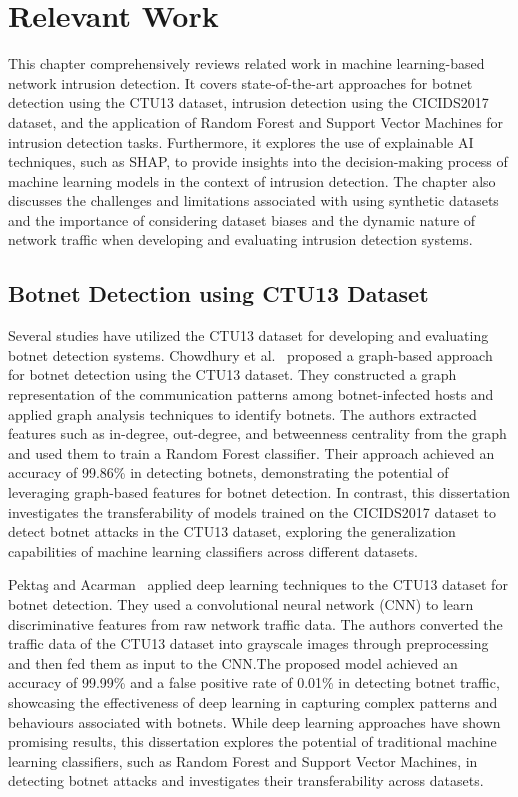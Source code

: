 \chapter{Relevant Work}

This chapter comprehensively reviews related work in machine learning-based network intrusion detection. It covers state-of-the-art approaches for botnet detection using the CTU13 dataset, intrusion detection using the CICIDS2017 dataset, and the application of Random Forest and Support Vector Machines for intrusion detection tasks. Furthermore, it explores the use of explainable AI techniques, such as SHAP, to provide insights into the decision-making process of machine learning models in the context of intrusion detection. The chapter also discusses the challenges and limitations associated with using synthetic datasets and the importance of considering dataset biases and the dynamic nature of network traffic when developing and evaluating intrusion detection systems.

\section{Botnet Detection using CTU13 Dataset}

Several studies have utilized the CTU13 dataset for developing and evaluating botnet detection systems. Chowdhury et al.~\cite{chowdhury2017botnet} proposed a graph-based approach for botnet detection using the CTU13 dataset. They constructed a graph representation of the communication patterns among botnet-infected hosts and applied graph analysis techniques to identify botnets. The authors extracted features such as in-degree, out-degree, and betweenness centrality from the graph and used them to train a Random Forest classifier. Their approach achieved an accuracy of 99.86\% in detecting botnets, demonstrating the potential of leveraging graph-based features for botnet detection. In contrast, this dissertation investigates the transferability of models trained on the CICIDS2017 dataset to detect botnet attacks in the CTU13 dataset, exploring the generalization capabilities of machine learning classifiers across different datasets.

Pektaş and Acarman~\cite{pektacs2019deep} applied deep learning techniques to the CTU13 dataset for botnet detection. They used a convolutional neural network (CNN) to learn discriminative features from raw network traffic data. The authors converted the traffic data of the CTU13 dataset into grayscale images through preprocessing and then fed them as input to the CNN.\@ The proposed model achieved an accuracy of 99.99\% and a false positive rate of 0.01\% in detecting botnet traffic, showcasing the effectiveness of deep learning in capturing complex patterns and behaviours associated with botnets. While deep learning approaches have shown promising results, this dissertation explores the potential of traditional machine learning classifiers, such as Random Forest and Support Vector Machines, in detecting botnet attacks and investigates their transferability across datasets.

